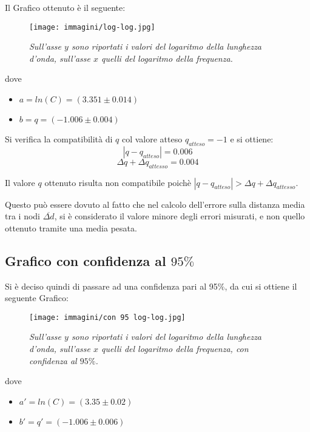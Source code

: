 \documentclass[12pt, a4paper]{article}
\begin{document}
Il Grafico ottenuto è il seguente:

\begin{figure}[h!]
\centering
\texttt{[image: immagini/log-log.jpg]}
    \centering
    \caption{\textit{Sull'asse $y$ sono riportati i valori del logaritmo della lunghezza d'onda, sull'asse $x$ quelli del logaritmo della frequenza.}}
\end{figure}

dove 
\begin{itemize}
    \item $a=ln(C)=(3.351\pm0.014)$
    \item $b=q=(-1.006\pm0.004)$
\end{itemize}

Si verifica la compatibilità di $q$ col valore atteso $q_{atteso}=-1$ e si ottiene:
\begin{equation*}
    |q-q_{atteso}| = 0.006 
\end{equation*} 
\begin{equation*}
     \Delta q + \Delta q_{attesso} = 0.004
\end{equation*}
\bigskip

Il valore $q$ ottenuto risulta non compatibile poichè $|q-q_{atteso}|>\Delta q + \Delta q_{attesso}$.
\bigskip

Questo può essere dovuto al fatto che nel calcolo dell'errore sulla distanza media tra i nodi $\overline{\Delta d}$, si è considerato il valore minore degli errori misurati, e non quello ottenuto tramite una media pesata.
\bigskip

\subsection{Grafico con confidenza al $95\%$}
Si è deciso quindi di passare ad una confidenza pari al 95$\%$, da cui si ottiene il seguente Grafico:

\begin{figure}[!htb]
\centering
\texttt{[image: immagini/con 95 log-log.jpg]}
    \centering
    \caption{\textit{Sull'asse $y$ sono riportati i valori del logaritmo della lunghezza d'onda, sull'asse $x$ quelli del logaritmo della frequenza, con confidenza al $95\%$.}}
    \label{im: 95 log log}
\end{figure}
\newpage

dove 
\begin{itemize}
    \item $a'=ln(C)=(3.35\pm0.02)$
    \item $b'=q'=(-1.006\pm0.006)$
\end{itemize}
\end{document}

